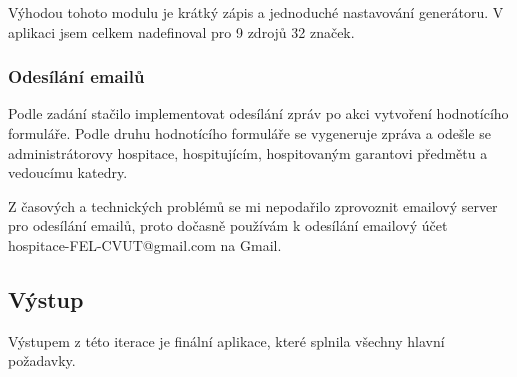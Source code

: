 Výhodou tohoto modulu je krátký zápis a jednoduché nastavování generátoru. V aplikaci jsem celkem nadefinoval pro 9 zdrojů 32 značek.
 
\subsubsection{Odesílání emailů}
Podle zadání stačilo implementovat odesílání zpráv po akci vytvoření hodnotícího formuláře. Podle druhu hodnotícího formuláře se vygeneruje zpráva a odešle se administrátorovy hospitace, hospitujícím, hospitovaným garantovi předmětu a vedoucímu katedry. 

Z časových a technických problémů se mi nepodařilo zprovoznit emailový server pro odesílání emailů, proto dočasně používám k odesílání emailový účet hospitace-FEL-CVUT@gmail.com na Gmail.

\subsection{Výstup}
Výstupem z této iterace je finální aplikace, které splnila všechny hlavní požadavky. 